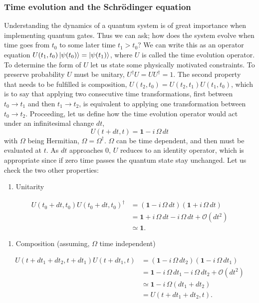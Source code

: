 \subsubsection{Time evolution and the Schrödinger equation}
Understanding the dynamics of a quantum system is of great importance when implementing quantum gates. Thus we can ask; how does the system evolve when time goes from $t_0$ to some later time $t_1 > t_0$? We can write this as an operator equation $U(t_1,t_0)\ket{\psi(t_0)} = \ket{\psi(t_1)}$, where $U$ is called the time evolution operator. To determine the form of $U$ let us state some physically motivated constraints. To preserve probability $U$ must be unitary, $U^\dagger U = UU^\dagger = 1$. The second property that needs to be fulfilled is composition, $U(t_2,t_0) = U(t_2,t_1)U(t_1,t_0)$, which is to say that applying two consecutive time transformations, first between $t_0 \rightarrow t_1$ and then $t_1 \rightarrow t_2$, is equivalent to applying one transformation between $t_0 \rightarrow t_2$. 
Proceeding, let us define how the time evolution operator would act under an infinitesimal change $dt$,
\begin{equation}
U(t+dt, t) = \mathbf{1} - i\,\Omega\,dt
\end{equation}
with $\Omega$ being Hermitian, $\Omega = \Omega^\dagger$. $\Omega$ can be time dependent, and then must be evaluated at $t$. As $dt$ approaches $0$, $U$ reduces to an identity operator, which is appropriate since if zero time passes the quantum state stay  unchanged.
Let us check the two other properties:
\begin{enumerate}
\item Unitarity
\end{enumerate}
\begin{equation}
\begin{aligned}
U(t_0 +dt, t_0)U(t_0 +dt, t_0)^\dagger &= \left( \mathbf{1} - i\,\Omega\,dt \right)\left(\mathbf{1} + i\,\Omega\,dt \right) \\&= \mathbf{1} + i\,\Omega\,dt - i\,\Omega\,dt + \mathcal{O}(dt^2) \\&\simeq \mathbf{1}.
\end{aligned}
\end{equation}
\begin{enumerate}[resume]
\item Composition (assuming, $\Omega$ time independent)
\end{enumerate}
\begin{equation}
\begin{aligned}
U(t + dt_1 + dt_2,t + dt_1)U(t+ dt_1,t) &= (\mathbf{1} - i\,\Omega\,dt_2)(\mathbf{1} - i\,\Omega\,dt_1) \\&= \mathbf{1} - i\,\Omega\,dt_1 - i\,\Omega\,dt_2 + \mathcal{O}(dt^2) \\&\simeq \mathbf{1} - i\,\Omega(dt_1 + dt_2) \\&= U(t + dt_1 + dt_2,t).
\end{aligned}
\end{equation}
